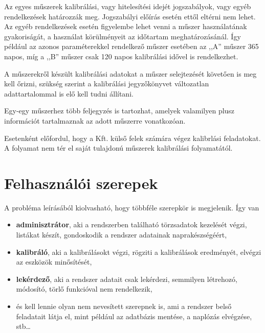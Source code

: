 \documentclass[a4paper,12pt]{report}
\begin{document}
Az egyes műszerek kalibrálási, vagy hitelesítési idejét jogszabályok, vagy egyéb
rendelkezések határozzák meg. Jogszabályi előírás esetén ettől eltérni nem lehet.
Az egyéb rendelkezések esetén figyelembe lehet venni a műszer használatának
gyakoriságát, a használat körülményeit az időtartam meghatározásánál. 
Így például az azonos paraméterekkel rendelkező műszer esetében az ,,A'' műszer
365 napos, míg a ,,B'' műszer csak 120 napos kalibrálási idővel is rendelkezhet.

A műszerekről készült kalibrálási adatokat a műszer selejtezését követően is 
meg kell őrizni, szükség szerint a kalibrálási jegyzőkönyvet változatlan 
adattartalommal is elő kell tudni állítani.

Egy-egy műszerhez több feljegyzés is tartozhat, amelyek valamilyen plusz 
információt tartalmaznak az adott műszerre vonatkozóan. 

Esetenként előfordul, hogy a Kft. külső felek számára végez kalibrlási 
feladatokat. A folyamat nem tér el saját tulajdonú műszerek kalibrálási 
folyamatától.

\section{Felhasználói szerepek}
A probléma leírásából kiolvasható, hogy többféle szerepkör is megjelenik. Így 
van
\begin{itemize}
 \item \textbf{adminisztrátor}, aki a rendszerben található törzsadatok 
kezelését végzi, listákat készít, gondoskodik a rendszer adatainak 
naprakészségéért,
\item \textbf{kalibráló}, aki a kalibrálásokt végzi, rögziti a kalibrálások 
eredményét, elvégzi az eszközök minősítését,
\item \textbf{lekérdező}, aki a rendszer adatait csak lekérdezi, semmilyen 
létrehozó, módosító, törlő funkcióval nem rendelkezik,
\item és kell lennie olyan nem nevesített szerepnek is, ami a rendszer belső 
feladatait látja el, mint például az adatbázis mentése, a naplózás elvégzése, 
stb\dots
\end{itemize}
\end{document}
